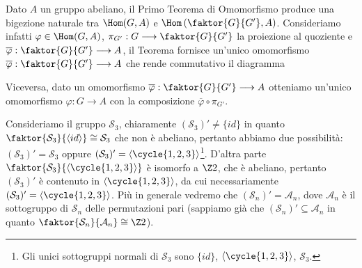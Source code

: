 \documentclass[11pt]{scrartcl}
\begin{document}
\begin{remark}
    Dato $A$ un gruppo abeliano, il Primo Teorema di Omomorfismo produce una bigezione naturale tra 
    $\Hom(G, A)$ e $\Hom\left(\faktor{G}{G'}, A\right)$. Consideriamo infatti $\varphi \in \Hom(G, A)$,
    $\pi_{G'}: G \longrightarrow \faktor{G}{G'}$ la proiezione al quoziente e 
    $\overline{\varphi} : \faktor{G}{G'}\longrightarrow A$, il Teorema
    fornisce un'unico omomorfismo $\overline{\varphi}: \faktor{G}{G'}\longrightarrow A$
    che rende commutativo il diagramma
    \begin{center}
    \end{center}
    Viceversa, dato un omomorfismo $\overline{\varphi}:\faktor{G}{G'}\longrightarrow A$
    otteniamo un'unico omomorfismo $\varphi:G\longrightarrow A$ con la 
    composizione $\overline{\varphi}\circ\pi_{G'}$.
\end{remark}

\begin{example}
    Consideriamo il gruppo $\mathcal{S}_3$, chiaramente $(\mathcal{S}_3)' \neq \{id\}$ in quanto
    $\faktor{\mathcal{S}_3}{\langle id\rangle} \cong \mathcal{S}_3$ che non è abeliano, pertanto 
    abbiamo due possibilità: $(\mathcal{S}_3)' = \mathcal{S}_3$ oppure $(\mathcal{S}_3)' = \langle\cycle{1, 2, 3}\rangle$\footnote{
        Gli unici sottogruppi normali di $\mathcal{S}_3$ sono $\{id\}$, 
        $\langle\cycle{1, 2, 3}\rangle$, $\mathcal{S}_3$.}. D'altra parte 
        $\faktor{\mathcal{S}_3}{\langle\cycle{1, 2, 3}\rangle}$ è isomorfo a $\Z2$, che
        è abeliano, pertanto $(\mathcal{S}_3)'$ è contenuto in $\langle\cycle{1, 2, 3}\rangle$,
        da cui necessariamente $(\mathcal{S}_3)' = \langle\cycle{1, 2, 3}\rangle$.
        Più in generale vedremo che $(\mathcal{S}_n)' = \mathcal{A}_n$, dove $\mathcal{A}_n$ è il sottogruppo
        di $\mathcal{S}_n$ delle permutazioni pari (sappiamo già che $(\mathcal{S}_n)' \subseteq
        \mathcal{A}_n$ in quanto $\faktor{\mathcal{S}_n}{\mathcal{A}_n}\cong\Z2$).
\end{example}
\end{document}
